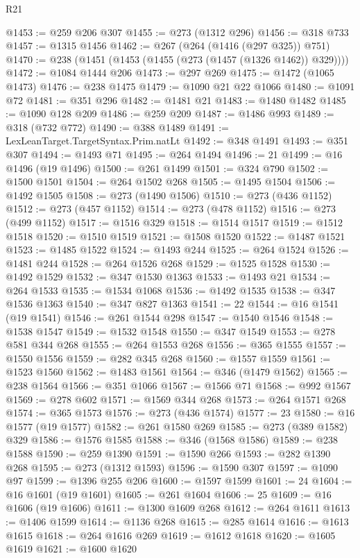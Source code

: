 \begin{lexlean}{R21}
\begin{coremodule}
{{{{{{{{{{{{{{{{{{{@1453 := @259 @206 @307
@1455 := @273 (@1312 @296)
@1456 := @318 @733
@1457 := @1315 @1456
@1462 := @267 (@264 (@1416 (@297 @325)) @751)
@1470 := @238 (@1451 (@1453 (@1455 (@273 (@1457 (@1326 @1462)) @329))))
@1472 := @1084 @1444 @206
@1473 := @297 @269
@1475 := @1472 (@1065 @1473)
@1476 := @238 @1475
@1479 := @1090 @21 @22 @1066
@1480 := @1091 @72
@1481 := @351 @296
@1482 := @1481 @21
@1483 := @1480 @1482
@1485 := @1090 @128 @209
@1486 := @259 @209
@1487 := @1486 @993
@1489 := @318 (@732 @772)
@1490 := @388 @1489
@1491 := LexLeanTarget.TargetSyntax.Prim.natLt
@1492 := @348 @1491
@1493 := @351 @307
@1494 := @1493 @71
@1495 := @264 @1494
@1496 := 21
@1499 := @16 @1496 (@19 @1496)
@1500 := @261 @1499
@1501 := @324 @790
@1502 := @1500 @1501
@1504 := @264 @1502 @268
@1505 := @1495 @1504
@1506 := @1492 @1505
@1508 := @273 (@1490 @1506)
@1510 := @273 (@436 @1152)
@1512 := @273 (@457 @1152)
@1514 := @273 (@478 @1152)
@1516 := @273 (@499 @1152)
@1517 := @1516 @329
@1518 := @1514 @1517
@1519 := @1512 @1518
@1520 := @1510 @1519
@1521 := @1508 @1520
@1522 := @1487 @1521
@1523 := @1485 @1522
@1524 := @1493 @244
@1525 := @264 @1524
@1526 := @1481 @244
@1528 := @264 @1526 @268
@1529 := @1525 @1528
@1530 := @1492 @1529
@1532 := @347 @1530 @1363
@1533 := @1493 @21
@1534 := @264 @1533
@1535 := @1534 @1068
@1536 := @1492 @1535
@1538 := @347 @1536 @1363
@1540 := @347 @827 @1363
@1541 := 22
@1544 := @16 @1541 (@19 @1541)
@1546 := @261 @1544 @298
@1547 := @1540 @1546
@1548 := @1538 @1547
@1549 := @1532 @1548
@1550 := @347 @1549
@1553 := @278 @581 @344 @268
@1555 := @264 @1553 @268
@1556 := @365 @1555
@1557 := @1550 @1556
@1559 := @282 @345 @268
@1560 := @1557 @1559
@1561 := @1523 @1560
@1562 := @1483 @1561
@1564 := @346 (@1479 @1562)
@1565 := @238 @1564
@1566 := @351 @1066
@1567 := @1566 @71
@1568 := @992 @1567
@1569 := @278 @602
@1571 := @1569 @344 @268
@1573 := @264 @1571 @268
@1574 := @365 @1573
@1576 := @273 (@436 @1574)
@1577 := 23
@1580 := @16 @1577 (@19 @1577)
@1582 := @261 @1580 @269
@1585 := @273 (@389 @1582) @329
@1586 := @1576 @1585
@1588 := @346 (@1568 @1586)
@1589 := @238 @1588
@1590 := @259 @1390
@1591 := @1590 @266
@1593 := @282 @1390 @268
@1595 := @273 (@1312 @1593)
@1596 := @1590 @307
@1597 := @1090 @97
@1599 := @1396 @255 @206
@1600 := @1597 @1599
@1601 := 24
@1604 := @16 @1601 (@19 @1601)
@1605 := @261 @1604
@1606 := 25
@1609 := @16 @1606 (@19 @1606)
@1611 := @1300 @1609 @268
@1612 := @264 @1611
@1613 := @1406 @1599
@1614 := @1136 @268
@1615 := @285 @1614
@1616 := @1613 @1615
@1618 := @264 @1616 @269
@1619 := @1612 @1618
@1620 := @1605 @1619
@1621 := @1600 @1620
}}}}}}}}}}}}}}}}}}}
\end{coremodule}
\end{lexlean}
